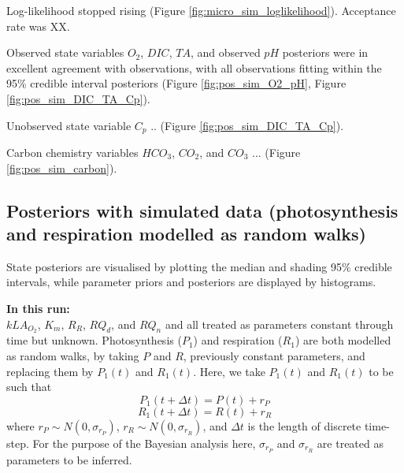 \documentclass{ruthesis}
\begin{document}
Log-likelihood stopped rising (Figure \ref{fig:micro_sim_loglikelihood}).
Acceptance rate was XX.


Observed state variables $O_2$, $DIC$, $TA$, and observed $pH$ posteriors were in excellent agreement with observations, with all observations fitting within the 95\% credible interval posteriors (Figure \ref{fig:pos_sim_O2_pH}, Figure \ref{fig:pos_sim_DIC_TA_Cp}).

Unobserved state variable $C_p$ .. (Figure \ref{fig:pos_sim_DIC_TA_Cp}).

Carbon chemistry variables $HCO_3$, $CO_2$, and $CO_3$ ... (Figure \ref{fig:pos_sim_carbon}).


\FloatBarrier
\subsection{Posteriors with simulated data (photosynthesis and respiration modelled as random walks)}\label{sec:micro_sim_results2}

State posteriors are visualised by plotting the median and shading 95\% credible intervals, while parameter priors and posteriors are displayed by histograms.

\textbf{In this run:}\\
$kLA_{O_2}$, $K_m$, $R_R$, $RQ_d$, and $RQ_n$ and all treated as parameters constant through time but unknown. 
Photosynthesis ($P_1$) and respiration ($R_1$) are both modelled as random walks, by taking \begin{math}P\end{math} and \begin{math}R\end{math}, previously constant parameters, and replacing them by \begin{math}P_1(t)\end{math} and \begin{math}R_1(t)\end{math}. Here, we take \begin{math}P_1(t)\end{math} and \begin{math}R_1(t)\end{math} to be such that
\begin{displaymath}
P_1(t+\Delta t) = P(t) + r_P
\end{displaymath}
\begin{displaymath}
R_1(t+\Delta t) = R(t) + r_R
\end{displaymath}
where \begin{math}
r_P \sim N(0, \sigma_{r_P})
\end{math}, \begin{math}
r_R \sim N(0, \sigma_{r_R})
\end{math}, and \begin{math}
\Delta t
\end{math} is the length of discrete time-step. For the purpose of the Bayesian analysis here, \begin{math}\sigma_{r_P}\end{math} and \begin{math}\sigma_{r_R}\end{math} are treated as parameters to be inferred. 
\end{document}
